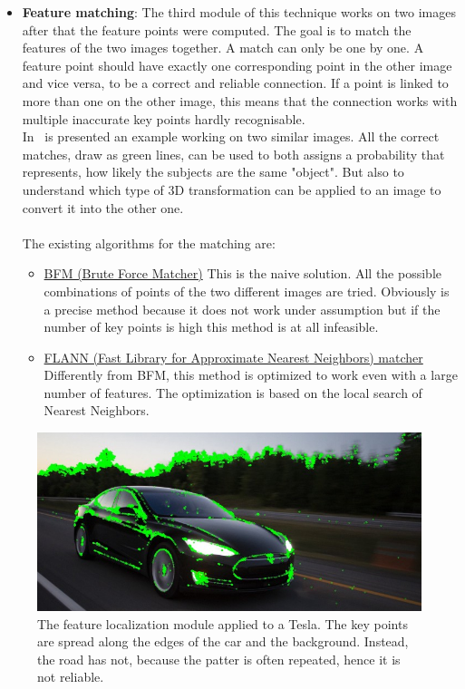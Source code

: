 \begin{itemize}
	\item \textbf{Feature matching}: The third module of this technique works on two images after that the feature points were computed. The goal is to match the features of the two images together. A match can only be one by one. A feature point should have exactly one corresponding point in the other image and vice versa, to be a correct and reliable connection. If a point is linked to more than one on the other image, this means that the connection works with multiple inaccurate key points hardly recognisable.\\
	In~ is presented an example working on two similar images. All the correct matches, draw as green lines, can be used to both assigns a probability that represents, how likely the subjects are the same "object". But also to understand which type of 3D transformation can be applied to an image to convert it into the other one.\\
	\\
	The existing algorithms for the matching are:
	\begin{itemize}
		\item \underline{BFM (Brute Force Matcher)} This is the naive solution. All the possible combinations of points of the two different images are tried. Obviously is a precise method because it does not work under assumption but if the number of key points is high this method is at all infeasible.
		\item \underline{FLANN (Fast Library for Approximate Nearest Neighbors) matcher}\cite{flann} Differently from BFM, this method is optimized to work even with a large number of features. The optimization is based on the local search of Nearest Neighbors.
	\end{itemize}
\end{itemize}
\begin{figure}[!h]
	\centering
	\includegraphics[width=0.7\linewidth]{images/recognition/kpMatch_tesla}
	\caption{The feature localization module applied to a Tesla. The key points are spread along the edges of the car and the background. Instead, the road has not, because the patter is often repeated, hence it is not reliable.}
	\label{fig:kpMatch_tesla}
\end{figure}
